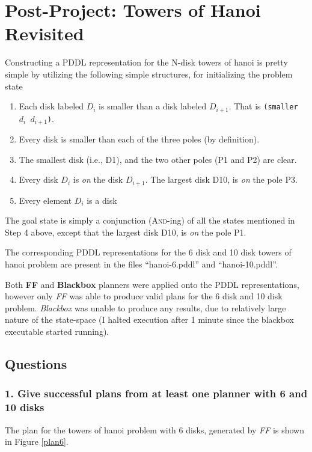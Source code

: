 \documentclass[10pt, letter]{article}
\begin{document}

\section{Post-Project: Towers of Hanoi Revisited}
Constructing a PDDL representation for the N-disk towers of hanoi is pretty simple by utilizing the following simple structures, for initializing the problem state
\begin{enumerate}
\item Each disk labeled $D_i$ is smaller than a disk labeled $D_{i+1}$. That is \texttt{(smaller $d_i$ $d_{i+1}$)}.
\item Every disk is smaller than each of the three poles (by definition).
\item The smallest disk (i.e., D1), and the two other poles (P1 and P2) are clear.
\item Every disk $D_i$ is \emph{on} the disk $D_{i+1}$. The largest disk D10, is \emph{on} the pole P3.
\item Every element $D_i$ is a disk
\end{enumerate}
The goal state is simply a conjunction (\textsc{And}-ing) of all the states mentioned in Step 4 above, except that the largest disk D10, is \emph{on} the pole P1.

The corresponding PDDL representations for the 6 disk and 10 disk towers of hanoi problem are present in the files ``hanoi-6.pddl'' and ``hanoi-10.pddl''.

Both \textbf{FF} and \textbf{Blackbox} planners were applied onto the PDDL representations, however only \textit{FF} was able to produce valid plans for the 6 disk and 10 disk problem. \textit{Blackbox} was unable to produce any results, due to relatively large nature of the state-space (I halted execution after 1 minute since the blackbox executable started running).

\subsection{Questions}
\subsubsection*{1. Give successful plans from at least one planner with 6 and 10 disks}
The plan for the towers of hanoi problem with 6 disks, generated by \textit{FF} is shown in Figure \ref{plan6}.
\end{document}
